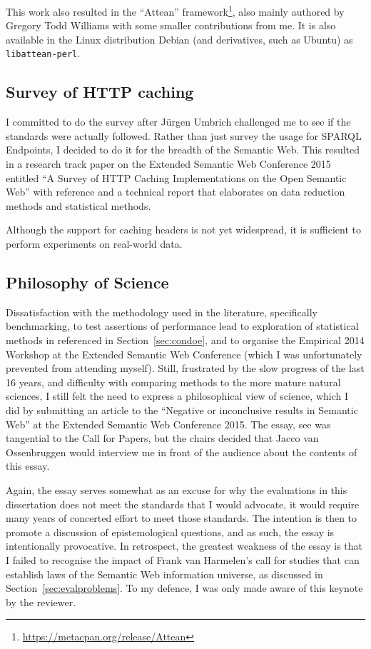 This work also resulted in the ``Attean''
framework\footnote{\url{https://metacpan.org/release/Attean}}, also
mainly authored by Gregory Todd Williams with some smaller
contributions from me. It is also available in the Linux distribution
Debian (and derivatives, such as Ubuntu) as \texttt{libattean-perl}.

\subsection{Survey of HTTP caching}\label{sec:consanity}

I committed to do the survey after Jürgen Umbrich challenged me to see
if the standards were actually followed. Rather than just survey the
usage for SPARQL Endpoints, I decided to do it for the breadth of the
Semantic Web. This resulted in a research track paper on the Extended
Semantic Web Conference 2015 entitled ``A Survey of HTTP Caching
Implementations on the Open Semantic Web'' with reference
\cite{kjernsmo_survey_2015} and a technical report
\cite{kjernsmo_add_survey_2015} that elaborates on data reduction
methods and statistical methods.

Although the support for caching headers is not yet widespread, it is
sufficient to perform experiments on real-world data.

\subsection{Philosophy of Science}\label{sec:conphil}

Dissatisfaction with the methodology used in the literature,
specifically benchmarking, to test assertions of performance lead to
exploration of statistical methods in referenced in
Section~\ref{sec:condoe}, and to organise the Empirical 2014 Workshop
at the Extended Semantic Web Conference (which I was unfortunately
prevented from attending myself). Still, frustrated by the slow
progress of the last 16 years, and difficulty with comparing methods
to the more mature natural sciences, I still felt the need to express
a philosophical view of science, which I did by submitting an article
to the ``Negative or inconclusive results in Semantic Web'' at the
Extended Semantic Web Conference 2015. The essay, see
\cite{kjernsmo_noise_2015} was tangential to the Call for Papers, but
the chairs decided that Jacco van Ossenbruggen would interview me in
front of the audience about the contents of this essay.

Again, the essay serves somewhat as an excuse for why the evaluations
in this dissertation does not meet the standards that I would
advocate, it would require many years of concerted effort to meet
those standards. The intention is then to promote a discussion of
epistemological questions, and as such, the essay is intentionally
provocative.  In retrospect, the greatest weakness of the essay is
that I failed to recognise the impact of Frank van Harmelen's call for
studies that can establish laws of the Semantic Web information
universe, as discussed in Section~\ref{sec:evalproblems}. To my
defence, I was only made aware of this keynote by the
reviewer. 
